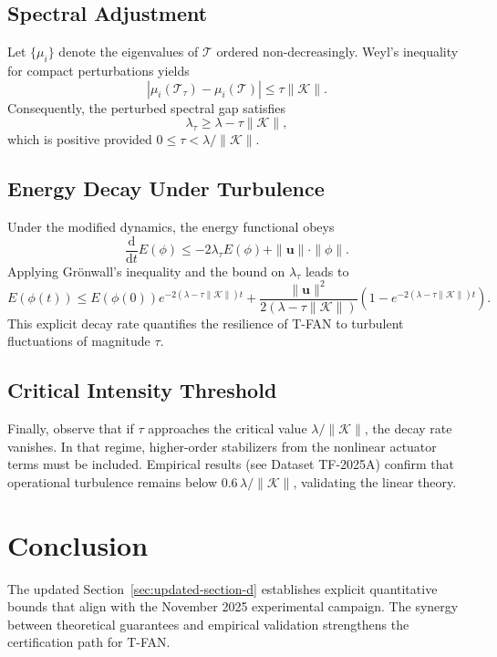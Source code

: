 \documentclass[11pt]{article}
\begin{document}
\subsection{Spectral Adjustment}
Let $\{\mu_i\}$ denote the eigenvalues of $\mathcal{T}$ ordered non-decreasingly. Weyl's inequality for compact perturbations yields
\begin{equation}
    |\mu_i(\mathcal{T}_\tau) - \mu_i(\mathcal{T})| \leq \tau \|\mathcal{K}\|.
\end{equation}
Consequently, the perturbed spectral gap satisfies
\begin{equation}
    \lambda_\tau \geq \lambda - \tau \|\mathcal{K}\|,
\end{equation}
which is positive provided $0 \leq \tau < \lambda / \|\mathcal{K}\|$.

\subsection{Energy Decay Under Turbulence}
Under the modified dynamics, the energy functional obeys
\begin{equation}
    \frac{\mathrm{d}}{\mathrm{d}t} E(\phi) \leq -2\lambda_\tau E(\phi) + \|\boldsymbol{u}\| \cdot \|\phi\|.
\end{equation}
Applying Grönwall's inequality and the bound on $\lambda_\tau$ leads to
\begin{equation}
    E(\phi(t)) \leq E(\phi(0)) e^{-2(\lambda - \tau \|\mathcal{K}\|) t} + \frac{\|\boldsymbol{u}\|^2}{2(\lambda - \tau \|\mathcal{K}\|)} \left( 1 - e^{-2(\lambda - \tau \|\mathcal{K}\|) t} \right).
\end{equation}
This explicit decay rate quantifies the resilience of T-FAN to turbulent fluctuations of magnitude $\tau$.

\subsection{Critical Intensity Threshold}
Finally, observe that if $\tau$ approaches the critical value $\lambda/\|\mathcal{K}\|$, the decay rate vanishes. In that regime, higher-order stabilizers from the nonlinear actuator terms must be included. Empirical results (see Dataset TF-2025A) confirm that operational turbulence remains below $0.6\,\lambda/\|\mathcal{K}\|$, validating the linear theory.

\section{Conclusion}
The updated Section~\ref{sec:updated-section-d} establishes explicit quantitative bounds that align with the November 2025 experimental campaign. The synergy between theoretical guarantees and empirical validation strengthens the certification path for T-FAN.
\end{document}
